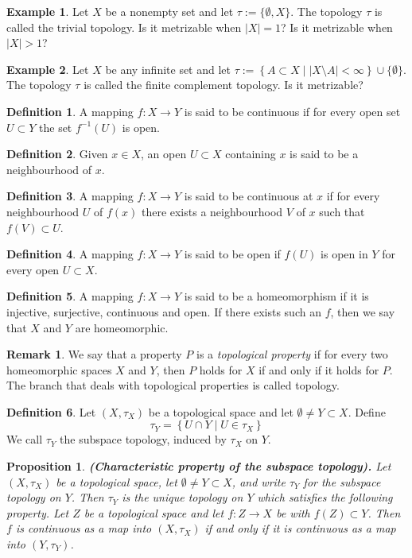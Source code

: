 \documentclass[11pt,a4paper]{article}
\theoremstyle{definition}
\newtheorem{definition}{Definition}[section]
\newtheorem{remark}{Remark}[section]
\newtheorem{example}{Example}[section]
\theoremstyle{plain}
\newtheorem{proposition}[theorem]{Proposition}
\newcommand{\set}[2]{ \left\{ #1 \mid #2 \right\} }
\newcommand{\abs}[1]{\left\lvert #1\right\rvert}
\begin{document}
	\begin{example}
		Let $X$ be a nonempty set and let $\tau := \{\emptyset,X\}$. The topology 
		$\tau$ is called the trivial topology. Is it metrizable when $|X| = 1$?
		Is it metrizable when $|X| > 1$?
	\end{example}
	\begin{example}
		Let $X$ be any infinite set and let 
		$\tau := \set{A \subset X}{\abs{X \setminus A} < \infty} \cup
		\{\emptyset\}.$ 
		The topology $\tau$ is called the finite complement topology. Is it 
		metrizable?
	\end{example}
	\begin{definition}
		A mapping $f \colon X \to Y$ is said to be continuous if for every open
		set $U \subset Y$ the set $f^{-1}(U)$ is open.
	\end{definition}
	\begin{definition}
		Given $x \in X$, an open $U \subset X$ containing $x$ is said to be a
		neighbourhood of $x$.
	\end{definition}
	\begin{definition}
		A mapping $f \colon X \to Y$ is said to be continuous at $x$ if for 
		every neighbourhood $U$ of $f(x)$ there exists a neighbourhood $V$
		of $x$ such that $f(V) \subset U$.
	\end{definition}
	\begin{definition}
		A mapping $f \colon X \to Y$ is said to be open if $f(U)$ is open in $Y$
		for every open $U \subset X$.
	\end{definition}
	\begin{definition}
		A mapping $f \colon X \to Y$ is said to be a homeomorphism if it is
		injective, surjective, continuous and open. If there exists such an $f$, 
		then we say that $X$ and $Y$ are homeomorphic.
	\end{definition}
	\begin{remark}
		We say that a property $P$ is a \emph{topological property} if for every
		two homeomorphic spaces $X$ and $Y$, then $P$ holds for $X$ if and only
		if it holds for $P$. The branch that deals with topological properties
		is called topology.
	\end{remark}
	\begin{definition}
		Let $(X,\tau_X)$ be a topological space and let $\emptyset \neq Y \subset 
		X$. Define
		\[
			\tau_Y = \set{U \cap Y}{U \in \tau_X}
		\]
		We call $\tau_Y$ the subspace topology, induced by $\tau_X$ on $Y$.
	\end{definition}
	\begin{proposition}
		\textnormal{\textbf{(Characteristic property of the subspace topology).}}
		Let $(X, \tau_X)$
		be a topological space, let $\emptyset \neq Y \subset X$, and write 
		$\tau_Y$ for the subspace topology on $Y$. Then $\tau_Y$ is the unique 
		topology on $Y$ which satisfies the following property. Let $Z$
		be a topological space and let $f \colon Z \to X$ be with 
		$f(Z) \subset Y$. Then $f$ is continuous as a map into $(X, \tau_X)$ if 
		and only if it is continuous as a map into $(Y, \tau_Y)$.
	\end{proposition}
\end{document}
